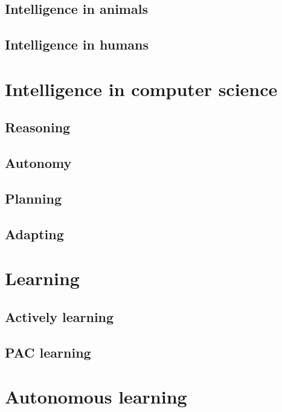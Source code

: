 \subsection{Intelligence in animals}\label{subsec:intelligence-in-animals}

\subsection{Intelligence in humans}\label{subsec:intelligence-in-humans}

\section{Intelligence in computer science}\label{sec:intelligence-in-computer-science}

\subsection{Reasoning}\label{subsec:reasoning}

\subsection{Autonomy}\label{subsec:autonomy}

\subsection{Planning}\label{subsec:planning}

\subsection{Adapting}\label{subsec:adapting}

\section{Learning}\label{sec:learning}

\subsection{Actively learning}\label{subsec:actively-learning}

\subsection{\Acl{PAC} learning}\label{subsec:pac-learning}

\section{Autonomous learning}\label{sec:autonomous-learning}

